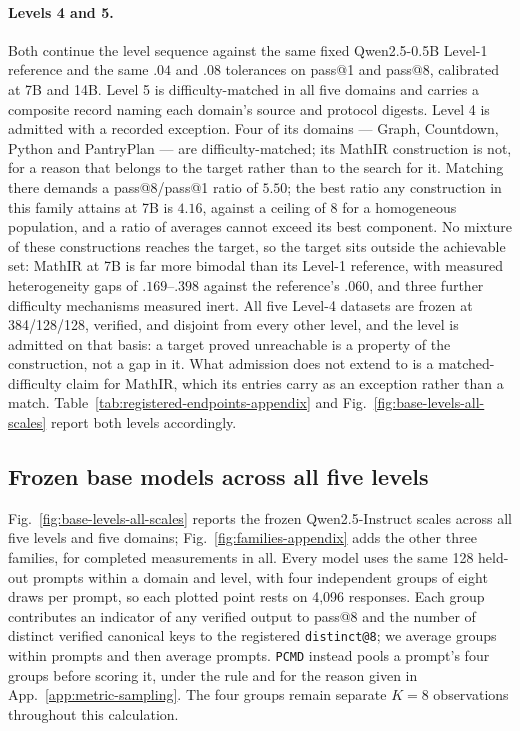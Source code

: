 \documentclass{article}
\makeatletter
\newcommand{\1}{\mathbf 1}
\newcommand{\pmd}{\texttt{PCMD}}
\newcommand{\distk}{\texttt{distinct@8}}
\theoremstyle{remark}
\theoremstyle{definition}
\theoremstyle{plain}
\makeatother
\begin{document}
\paragraph{Levels 4 and 5.}
Both continue the level sequence against the same fixed Qwen2.5-0.5B Level-1 reference
and the same $.04$ and $.08$ tolerances on pass@1 and pass@8, calibrated at 7B
and 14B. Level 5 is difficulty-matched in all five domains and carries a
composite record naming each domain's source and protocol digests. Level 4 is
admitted with a recorded exception. Four of its domains --- Graph, Countdown,
Python and PantryPlan --- are difficulty-matched; its MathIR construction is
not, for a reason that belongs to the target rather than to the search for it. Matching there demands a pass@8/pass@1 ratio of $5.50$; the best
ratio any construction in this family attains at 7B is $4.16$, against a ceiling
of $8$ for a homogeneous population, and a ratio of averages cannot exceed its
best component. No mixture of these constructions reaches the target, so the
target sits outside the achievable set: MathIR at 7B is far more bimodal than
its Level-1 reference, with measured heterogeneity gaps of $.169$--$.398$
against the reference's $.060$, and three further difficulty mechanisms measured
inert. All five Level-4 datasets are frozen at 384/128/128, verified, and
disjoint from every other level, and the level is admitted on that basis: a
target proved unreachable is a property of the construction, not a gap in it.
What admission does not extend to is a matched-difficulty claim for MathIR,
which its entries carry as an exception rather than a match.
Table~\ref{tab:registered-endpoints-appendix} and
Fig.~\ref{fig:base-levels-all-scales} report both levels accordingly.

\subsection{Frozen base models across all five levels}
\label{app:base-levels-all-scales}

Fig.~\ref{fig:base-levels-all-scales} reports the frozen Qwen2.5-Instruct
scales across all five levels and five domains;
Fig.~\ref{fig:families-appendix} adds the other three families, for
\MDcells{} completed measurements in all. Every model uses the same 128 held-out
prompts within a domain and level, with four independent groups of eight draws
per prompt, so each plotted point rests on 4,096 responses. Each group contributes an indicator
of any verified output to pass@8 and the number of distinct verified canonical
keys to the registered \distk{}; we average groups within prompts and then
average prompts. \pmd{} instead pools a prompt's four groups before scoring it,
under the rule and for the reason given in App.~\ref{app:metric-sampling}.
The four groups remain separate $K=8$ observations throughout this calculation.
\end{document}
